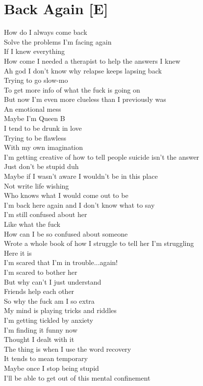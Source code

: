 \documentclass[12pt, b5paper, oneside]{book}
\begin{document}
\section{Back Again [E]}
How do I always come back
\\Solve the problems I'm facing again 
\\If I knew everything
\\How come I needed a therapist to help the answers I knew
\\Ah god I don't know why relapse keeps lapsing back
\\Trying to go slow-mo
\\To get more info of what the fuck is going on
\\But now I'm even more clueless than I previously was
\\An emotional mess
\\Maybe I'm Queen B
\\I tend to be drunk in love
\\Trying to be flawless
\\With my own imagination
\\I'm getting creative of how to tell people suicide isn't the answer
\\Just don't be stupid duh
\\Maybe if I wasn't aware I wouldn't be in this place
\\Not write life wishing
\\Who knows what I would come out to be
\\I'm back here again and I don't know what to say
\\I'm still confused about her
\\Like what the fuck
\\How can I be so confused about someone
\\Wrote a whole book of how I struggle to tell her I'm struggling
\\Here it is
\\I'm scared that I'm in trouble...again!
\\I'm scared to bother her
\\But why can't I just understand
\\Friends help each other
\\So why the fuck am I so extra
\\My mind is playing tricks and riddles
\\I'm getting tickled by anxiety
\\I'm finding it funny now
\\Thought I dealt with it
\\The thing is when I use the word recovery
\\It tends to mean temporary
\\Maybe once I stop being stupid
\\I'll be able to get out of this mental confinement 
\end{document}
